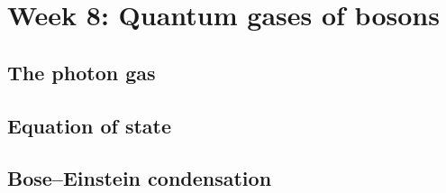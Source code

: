 \renewcommand{\thisweek}{MATH327 Week 8}
\renewcommand{\moddate}{Last modified 10 Apr.~2021}
\setcounter{section}{8}
\setcounter{subsection}{0}
{}
\section*{Week 8: Quantum gases of bosons}
\subsection{The photon gas}





\newpage
\subsection{Equation of state}



\newpage
\subsection{Bose--Einstein condensation}

